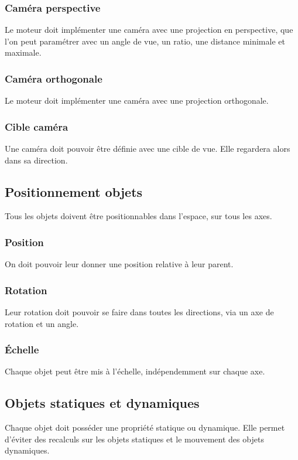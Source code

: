 \documentclass [a4 paper,11pt]{article}
\begin{document}
\subsubsection*{Caméra perspective}
Le moteur doit implémenter une caméra avec une projection en perspective, que l'on peut paramétrer avec un angle de vue,
un ratio, une distance minimale et maximale.

\subsubsection*{Caméra orthogonale}
Le moteur doit implémenter une caméra avec une projection orthogonale.

\subsubsection*{Cible caméra}
Une caméra doit pouvoir être définie avec une cible de vue.
Elle regardera alors dans sa direction.

\subsection{Positionnement objets}
Tous les objets doivent être positionnables dans l'espace, sur tous les axes.

\subsubsection*{Position}
On doit pouvoir leur donner une position relative à leur parent.

\subsubsection*{Rotation}
Leur rotation doit pouvoir se faire dans toutes les directions, via un axe de rotation et un angle.

\subsubsection*{Échelle}
Chaque objet peut être mis à l'échelle, indépendemment sur chaque axe.

\subsection{Objets statiques et dynamiques}
Chaque objet doit posséder une propriété statique ou dynamique.
Elle permet d'éviter des recalculs sur les objets statiques et le mouvement des objets dynamiques.
\end{document}
